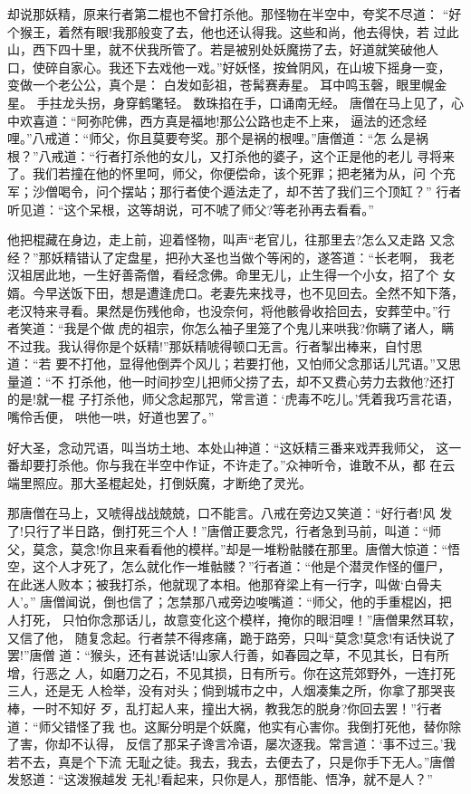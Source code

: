 却说那妖精，原来行者第二棍也不曾打杀他。那怪物在半空中，夸奖不尽道：
“好个猴王，着然有眼!我那般变了去，他也还认得我。这些和尚，他去得快，若
过此山，西下四十里，就不伏我所管了。若是被别处妖魔捞了去，好道就笑破他人
口，使碎自家心。我还下去戏他一戏。”好妖怪，按耸阴风，在山坡下摇身一变，
变做一个老公公，真个是：
白发如彭祖，苍髯赛寿星。
耳中鸣玉磬，眼里幌金星。
手拄龙头拐，身穿鹤氅轻。
数珠掐在手，口诵南无经。
唐僧在马上见了，心中欢喜道：“阿弥陀佛，西方真是福地!那公公路也走不上来，
逼法的还念经哩。”八戒道：“师父，你且莫要夸奖。那个是祸的根哩。”唐僧道：“怎
么是祸根？”八戒道：“行者打杀他的女儿，又打杀他的婆子，这个正是他的老儿
寻将来了。我们若撞在他的怀里呵，师父，你便偿命，该个死罪；把老猪为从，问
个充军；沙僧喝令，问个摆站；那行者使个遁法走了，却不苦了我们三个顶缸？”
行者听见道：“这个呆根，这等胡说，可不唬了师父?等老孙再去看看。”

他把棍藏在身边，走上前，迎着怪物，叫声“老官儿，往那里去?怎么又走路
又念经？”那妖精错认了定盘星，把孙大圣也当做个等闲的，遂答道：“长老啊，
我老汉祖居此地，一生好善斋僧，看经念佛。命里无儿，止生得一个小女，招了个
女婿。今早送饭下田，想是遭逢虎口。老妻先来找寻，也不见回去。全然不知下落，
老汉特来寻看。果然是伤残他命，也没奈何，将他骸骨收拾回去，安葬茔中。”行
者笑道：“我是个做虎的祖宗，你怎么袖子里笼了个鬼儿来哄我?你瞒了诸人，瞒
不过我。我认得你是个妖精!”那妖精唬得顿口无言。行者掣出棒来，自忖思道：“若
要不打他，显得他倒弄个风儿；若要打他，又怕师父念那话儿咒语。”又思量道：“不
打杀他，他一时间抄空儿把师父捞了去，却不又费心劳力去救他?还打的是!就一棍
子打杀他，师父念起那咒，常言道：‘虎毒不吃儿。’凭着我巧言花语，嘴伶舌便，
哄他一哄，好道也罢了。”

好大圣，念动咒语，叫当坊土地、本处山神道：“这妖精三番来戏弄我师父，
这一番却要打杀他。你与我在半空中作证，不许走了。”众神听令，谁敢不从，都
在云端里照应。那大圣棍起处，打倒妖魔，才断绝了灵光。

那唐僧在马上，又唬得战战兢兢，口不能言。八戒在旁边又笑道：“好行者!风
发了!只行了半日路，倒打死三个人！”唐僧正要念咒，行者急到马前，叫道：“师
父，莫念，莫念!你且来看看他的模样。”却是一堆粉骷髅在那里。唐僧大惊道：“悟
空，这个人才死了，怎么就化作一堆骷髅？”行者道：“他是个潜灵作怪的僵尸，
在此迷人败本；被我打杀，他就现了本相。他那脊梁上有一行字，叫做‘白骨夫人’。”
唐僧闻说，倒也信了；怎禁那八戒旁边唆嘴道：“师父，他的手重棍凶，把人打死，
只怕你念那话儿，故意变化这个模样，掩你的眼泪哩！”唐僧果然耳软，又信了他，
随复念起。行者禁不得疼痛，跪于路旁，只叫“莫念!莫念!有话快说了罢!”唐僧
道：“猴头，还有甚说话!山家人行善，如春园之草，不见其长，日有所增，行恶之
人，如磨刀之石，不见其损，日有所亏。你在这荒郊野外，一连打死三人，还是无
人检举，没有对头；倘到城市之中，人烟凑集之所，你拿了那哭丧棒，一时不知好
歹，乱打起人来，撞出大祸，教我怎的脱身?你回去罢！”行者道：“师父错怪了我
也。这厮分明是个妖魔，他实有心害你。我倒打死他，替你除了害，你却不认得，
反信了那呆子谗言冷语，屡次逐我。常言道：‘事不过三。’我若不去，真是个下流
无耻之徒。我去，我去，去便去了，只是你手下无人。”唐僧发怒道：“这泼猴越发
无礼!看起来，只你是人，那悟能、悟净，就不是人？”


